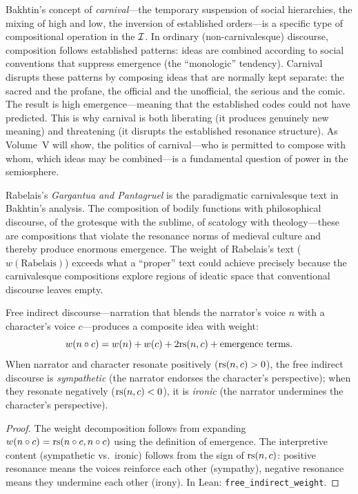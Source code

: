 \begin{remark}
\label{rem:carnival-emergence}
Bakhtin's concept of \emph{carnival}---the temporary suspension of social hierarchies, the mixing of high and low, the inversion of established orders---is a specific type of compositional operation in the $\mathcal{I}$.  In ordinary (non-carnivalesque) discourse, composition follows established patterns: ideas are combined according to social conventions that suppress emergence (the ``monologic'' tendency).  Carnival disrupts these patterns by composing ideas that are normally kept separate: the sacred and the profane, the official and the unofficial, the serious and the comic.  The result is high emergence---meaning that the established codes could not have predicted.  This is why carnival is both liberating (it produces genuinely new meaning) and threatening (it disrupts the established resonance structure).  As Volume~V will show, the politics of carnival---who is permitted to compose with whom, which ideas may be combined---is a fundamental question of power in the semiosphere.

Rabelais's \textit{Gargantua and Pantagruel} is the paradigmatic carnivalesque text in Bakhtin's analysis.  The composition of bodily functions with philosophical discourse, of the grotesque with the sublime, of scatology with theology---these are compositions that violate the resonance norms of medieval culture and thereby produce enormous emergence.  The weight of Rabelais's text ($w(\text{Rabelais})$) exceeds what a ``proper'' text could achieve precisely because the carnivalesque compositions explore regions of ideatic space that conventional discourse leaves empty.
\end{remark}

\begin{theorem}
\label{thm:free-indirect}
Free indirect discourse---narration that blends the narrator's voice $n$ with a character's voice $c$---produces a composite idea with weight:
\[
  w(n \circ c) = w(n) + w(c) + 2\mathrm{rs}(n, c) + \text{emergence terms}.
\]
When narrator and character resonate positively ($\mathrm{rs}(n, c) > 0$), the free indirect discourse is \emph{sympathetic} (the narrator endorses the character's perspective); when they resonate negatively ($\mathrm{rs}(n, c) < 0$), it is \emph{ironic} (the narrator undermines the character's perspective).
\end{theorem}

\begin{proof}
The weight decomposition follows from expanding $w(n \circ c) = \mathrm{rs}(n \circ c, n \circ c)$ using the definition of emergence.  The interpretive content (sympathetic vs.\ ironic) follows from the sign of $\mathrm{rs}(n, c)$: positive resonance means the voices reinforce each other (sympathy), negative resonance means they undermine each other (irony).  In Lean: \texttt{free\_indirect\_weight}.
\end{proof}

